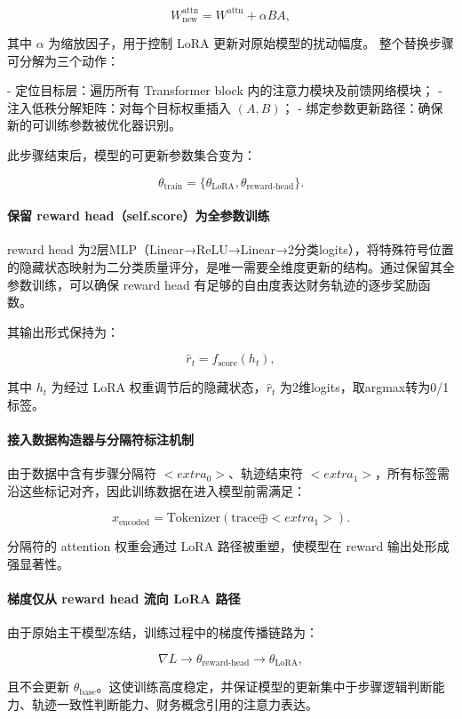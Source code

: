 \documentclass[professional,privacy,print,win,long,STEM,AutoFakeBold]{def/buaa}
\begin{document}
\[
W^{\text{attn}}_{\text{new}} = W^{\text{attn}} + \alpha BA ,
\]

其中 $\alpha$ 为缩放因子，用于控制 LoRA 更新对原始模型的扰动幅度。
整个替换步骤可分解为三个动作：

- 定位目标层：遍历所有 Transformer block 内的注意力模块及前馈网络模块；
- 注入低秩分解矩阵：对每个目标权重插入 $(A,B)$；
- 绑定参数更新路径：确保新的可训练参数被优化器识别。

此步骤结束后，模型的可更新参数集合变为：

\[
\theta_{\text{train}} = \{ \theta_{\text{LoRA}}, \theta_{\text{reward-head}}\}.
\]

\paragraph{保留 reward head（self.score）为全参数训练}

reward head 为2层MLP（Linear→ReLU→Linear→2分类logits），将特殊符号位置的隐藏状态映射为二分类质量评分，是唯一需要全维度更新的结构。通过保留其全参数训练，可以确保 reward head 有足够的自由度表达财务轨迹的逐步奖励函数。

其输出形式保持为：

\[
\hat{r}_t = f_{\text{score}}(h_t),
\]

其中 $h_t$ 为经过 LoRA 权重调节后的隐藏状态，$\hat{r}_t$ 为2维logits，取argmax转为0/1标签。

\paragraph{接入数据构造器与分隔符标注机制}

由于数据中含有步骤分隔符 $<extra_0>$、轨迹结束符 $<extra_1>$，所有标签需沿这些标记对齐，因此训练数据在进入模型前需满足：

\[
x_{\text{encoded}} = \text{Tokenizer}( \text{trace} \oplus <extra_1> ).
\]

分隔符的 attention 权重会通过 LoRA 路径被重塑，使模型在 reward 输出处形成强显著性。

\paragraph{梯度仅从 reward head 流向 LoRA 路径}

由于原始主干模型冻结，训练过程中的梯度传播链路为：

\[
\nabla L \rightarrow \theta_{\text{reward-head}} \rightarrow \theta_{\text{LoRA}},
\]

且不会更新 $\theta_{\text{base}}$。这使训练高度稳定，并保证模型的更新集中于步骤逻辑判断能力、轨迹一致性判断能力、财务概念引用的注意力表达。
\end{document}
